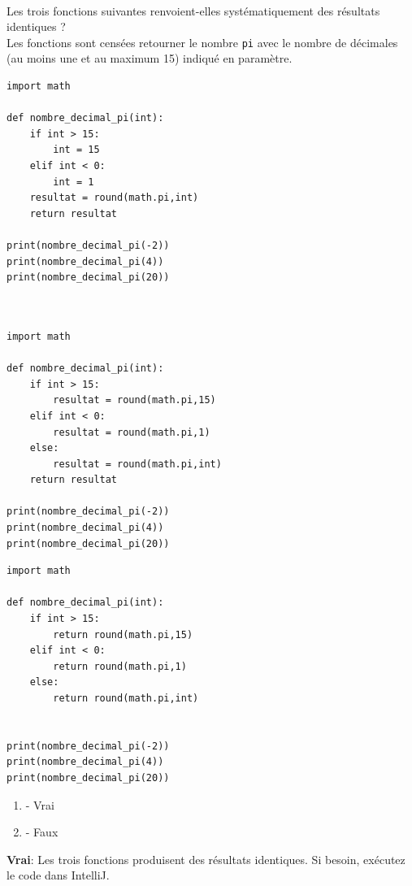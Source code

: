 \begin{Exercice}[5 minutes]\\
Les trois fonctions suivantes renvoient-elles systématiquement des résultats identiques ?\\Les fonctions sont censées retourner le nombre \lstinline{pi} avec le nombre de décimales (au moins une et au maximum 15) indiqué en paramètre.
\begin{multicols}{3}
\begin{lstlisting}
import math

def nombre_decimal_pi(int):
    if int > 15:
        int = 15
    elif int < 0:
        int = 1
    resultat = round(math.pi,int) 
    return resultat

print(nombre_decimal_pi(-2))
print(nombre_decimal_pi(4))
print(nombre_decimal_pi(20))



\end{lstlisting}
\columnbreak

\begin{lstlisting}
import math

def nombre_decimal_pi(int):
    if int > 15:
        resultat = round(math.pi,15)
    elif int < 0:
        resultat = round(math.pi,1)
    else: 
        resultat = round(math.pi,int)
    return resultat

print(nombre_decimal_pi(-2))
print(nombre_decimal_pi(4))
print(nombre_decimal_pi(20))

\end{lstlisting}
\columnbreak

\begin{lstlisting}
import math

def nombre_decimal_pi(int):
    if int > 15:
        return round(math.pi,15)
    elif int < 0:
        return round(math.pi,1)
    else: 
        return round(math.pi,int)
    

print(nombre_decimal_pi(-2))
print(nombre_decimal_pi(4))
print(nombre_decimal_pi(20))

\end{lstlisting}
\end{multicols}

\begin{enumerate}[label=\Alph*]
    \item - Vrai
    \item - Faux
\end{enumerate}
\begin{solution}
    \textbf{Vrai}: Les trois fonctions produisent des résultats identiques. Si besoin, exécutez le code dans IntelliJ.
\end{solution}
\end{Exercice}
